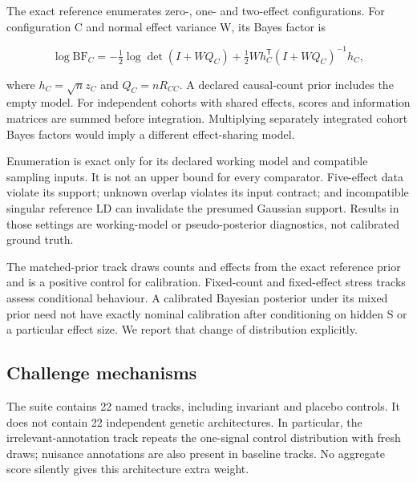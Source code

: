 \documentclass[
  british,
  10pt,
]{article}
\begin{document}
The exact reference enumerates zero-, one- and two-effect
configurations. For configuration C and normal effect variance W, its
Bayes factor is

\[\log\mathrm{BF}_C=-\tfrac12\log\det(I+WQ_C)
+\tfrac12W h_C^\mathsf{T}(I+WQ_C)^{-1}h_C,\]

where \(h_C=\sqrt n z_C\) and \(Q_C=nR_{CC}\). A declared causal-count
prior includes the empty model. For independent cohorts with shared
effects, scores and information matrices are summed before integration.
Multiplying separately integrated cohort Bayes factors would imply a
different effect-sharing model.

Enumeration is exact only for its declared working model and compatible
sampling inputs. It is not an upper bound for every comparator.
Five-effect data violate its support; unknown overlap violates its input
contract; and incompatible singular reference LD can invalidate the
presumed Gaussian support. Results in those settings are working-model
or pseudo-posterior diagnostics, not calibrated ground truth.

The matched-prior track draws counts and effects from the exact
reference prior and is a positive control for calibration. Fixed-count
and fixed-effect stress tracks assess conditional behaviour. A
calibrated Bayesian posterior under its mixed prior need not have
exactly nominal calibration after conditioning on hidden S or a
particular effect size. We report that change of distribution
explicitly.

\subsection{Challenge mechanisms}\label{challenge-mechanisms}

The suite contains 22 named tracks, including invariant and placebo
controls. It does not contain 22 independent genetic architectures. In
particular, the irrelevant-annotation track repeats the one-signal
control distribution with fresh draws; nuisance annotations are also
present in baseline tracks. No aggregate score silently gives this
architecture extra weight.
\end{document}
